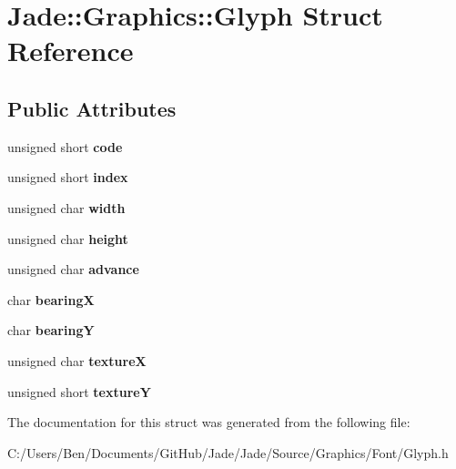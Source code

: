 \hypertarget{struct_jade_1_1_graphics_1_1_glyph}{}\section{Jade\+:\+:Graphics\+:\+:Glyph Struct Reference}
\label{struct_jade_1_1_graphics_1_1_glyph}
\subsection*{Public Attributes}
\begin{DoxyCompactItemize}
\item 
\hypertarget{struct_jade_1_1_graphics_1_1_glyph_aee3b4eda09fec64928fea6a202c3ce2e}{}unsigned short {\bfseries code}\label{struct_jade_1_1_graphics_1_1_glyph_aee3b4eda09fec64928fea6a202c3ce2e}

\item 
\hypertarget{struct_jade_1_1_graphics_1_1_glyph_a6b11fd38895cceab000cf60716648a2d}{}unsigned short {\bfseries index}\label{struct_jade_1_1_graphics_1_1_glyph_a6b11fd38895cceab000cf60716648a2d}

\item 
\hypertarget{struct_jade_1_1_graphics_1_1_glyph_ae8fb99f1d2f679a16a3b49ccf2b78231}{}unsigned char {\bfseries width}\label{struct_jade_1_1_graphics_1_1_glyph_ae8fb99f1d2f679a16a3b49ccf2b78231}

\item 
\hypertarget{struct_jade_1_1_graphics_1_1_glyph_a34914244424dc93c85ba6fe9b3078df5}{}unsigned char {\bfseries height}\label{struct_jade_1_1_graphics_1_1_glyph_a34914244424dc93c85ba6fe9b3078df5}

\item 
\hypertarget{struct_jade_1_1_graphics_1_1_glyph_a076ec3fbc977ad2c33888a21bc8c7995}{}unsigned char {\bfseries advance}\label{struct_jade_1_1_graphics_1_1_glyph_a076ec3fbc977ad2c33888a21bc8c7995}

\item 
\hypertarget{struct_jade_1_1_graphics_1_1_glyph_a8d7e9c402bfae3e6d997e312eb40970a}{}char {\bfseries bearing\+X}\label{struct_jade_1_1_graphics_1_1_glyph_a8d7e9c402bfae3e6d997e312eb40970a}

\item 
\hypertarget{struct_jade_1_1_graphics_1_1_glyph_ac6e557fde901dd7edc1ae995b0dc66cb}{}char {\bfseries bearing\+Y}\label{struct_jade_1_1_graphics_1_1_glyph_ac6e557fde901dd7edc1ae995b0dc66cb}

\item 
\hypertarget{struct_jade_1_1_graphics_1_1_glyph_a51caa8e00f9aaf53b5be2c7a90b9e20b}{}unsigned char {\bfseries texture\+X}\label{struct_jade_1_1_graphics_1_1_glyph_a51caa8e00f9aaf53b5be2c7a90b9e20b}

\item 
\hypertarget{struct_jade_1_1_graphics_1_1_glyph_addd81be24816b968f90048a9da149a33}{}unsigned short {\bfseries texture\+Y}\label{struct_jade_1_1_graphics_1_1_glyph_addd81be24816b968f90048a9da149a33}

\end{DoxyCompactItemize}


The documentation for this struct was generated from the following file\+:\begin{DoxyCompactItemize}
\item 
C\+:/\+Users/\+Ben/\+Documents/\+Git\+Hub/\+Jade/\+Jade/\+Source/\+Graphics/\+Font/Glyph.\+h\end{DoxyCompactItemize}
